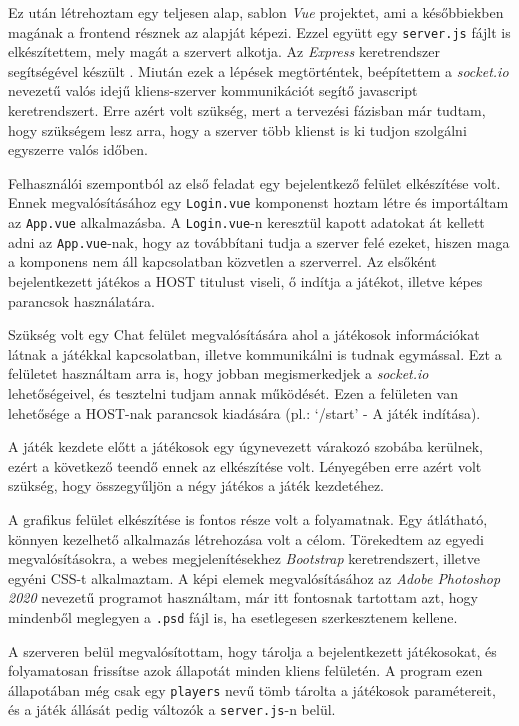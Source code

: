 Ez után létrehoztam egy teljesen alap, sablon \textit{Vue} projektet, ami a későbbiekben magának a frontend résznek az alapját képezi. Ezzel együtt egy \texttt{server.js} fájlt is elkészítettem, mely magát a szervert alkotja. Az \textit{Express} keretrendszer segítségével készült \cite{teixeira2012professional}. Miután ezek a lépések megtörténtek, beépítettem a \textit{socket.io} nevezetű valós idejű kliens-szerver kommunikációt segítő javascript keretrendszert. Erre azért volt szükség, mert a tervezési fázisban már tudtam, hogy szükségem lesz arra, hogy a szerver több klienst is ki tudjon szolgálni egyszerre valós időben.

Felhasználói szempontból az első feladat egy bejelentkező felület elkészítése volt. Ennek megvalósításához egy \texttt{Login.vue} komponenst hoztam létre és importáltam az \texttt{App.vue} alkalmazásba. A \texttt{Login.vue}-n keresztül kapott adatokat át kellett adni az \texttt{App.vue}-nak, hogy az továbbítani tudja a szerver felé ezeket, hiszen maga a komponens nem áll kapcsolatban közvetlen a szerverrel. Az elsőként bejelentkezett játékos a HOST titulust viseli, ő indítja a játékot, illetve képes parancsok használatára.

Szükség volt egy Chat felület megvalósítására ahol a játékosok információkat látnak a játékkal kapcsolatban, illetve kommunikálni is tudnak egymással. Ezt a felületet használtam arra is, hogy jobban megismerkedjek a \textit{socket.io} lehetőségeivel, és tesztelni tudjam annak működését. Ezen a felületen van lehetősége a HOST-nak parancsok kiadására (pl.: ‘/start’ - A játék indítása).

A játék kezdete előtt a játékosok egy úgynevezett várakozó szobába kerülnek, ezért a következő teendő ennek az elkészítése volt. Lényegében erre azért volt szükség, hogy összegyűljön a négy játékos a játék kezdetéhez.

A grafikus felület elkészítése is fontos része volt a folyamatnak. Egy átlátható, könnyen kezelhető alkalmazás létrehozása volt a célom. Törekedtem az egyedi megvalósításokra, a webes megjelenítésekhez \textit{Bootstrap} keretrendszert, illetve egyéni CSS-t alkalmaztam. A képi elemek megvalósításához az \textit{Adobe Photoshop 2020} nevezetű programot használtam, már itt fontosnak tartottam azt, hogy mindenből meglegyen a \texttt{.psd} fájl is, ha esetlegesen szerkesztenem kellene.

A szerveren belül megvalósítottam, hogy tárolja a bejelentkezett játékosokat, és folyamatosan frissítse azok állapotát minden kliens felületén. A program ezen állapotában még csak egy \texttt{players} nevű tömb tárolta a játékosok paramétereit, és a játék állását pedig változók a \texttt{server.js}-n belül.


